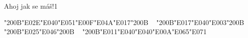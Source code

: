 \documentclass[12pt]{article}
\begin{document}
\charisfont
\noindent

\bigskip

​Ahoj jak se máš!1


\bigskip \bigskip
\newpage

\tengwarfont
\sloppy  %
\noindent


\bigskip
\raggedright %

\Large\char"200B{\color{red}\char"E02E\char"E040\char"E051}\char"E00F\char"E04A\char"E017\char"200B \mbox{ } \char"200B\char"E017\char"E040\char"E003\char"200B \mbox{ } \char"200B\char"E025\char"E046\char"200B \mbox{ } \char"200B\char"E011\char"E040\char"E040\char"E00A\char"E065\char"E071
\end{document}
